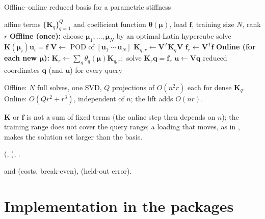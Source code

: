 \begin{algbox}{Offline--online reduced basis for a parametric stiffness}
\begin{pseudo}
\Require affine terms $\{\bm K_q\}_{q=1}^Q$ and coefficient function $\bm\theta(\bm\mu)$, load $\bm f$, training size $N$, rank $r$
\State \textbf{Offline (once):}
\State choose $\bm\mu_1,\dots,\bm\mu_N$ by an optimal Latin hypercube 
  \State solve $\bm K(\bm\mu_i)\bm u_i=\bm f$ 
\EndFor
\State $\bm V\gets$ POD of $[\bm u_1\ \cdots\ \bm u_N]$ 
  \State $\bm K_{q,r}\gets\bm V^T\bm K_q\bm V$
\EndFor
\State $\bm f_r\gets\bm V^T\bm f$
\State \textbf{Online (for each new $\bm\mu$):}
\State $\bm K_r\gets\sum_q\theta_q(\bm\mu)\bm K_{q,r}$;\ solve $\bm K_r\bm q=\bm f_r$
\State $\bm u\gets\bm V\bm q$ 
\Ensure reduced coordinates $\bm q$ (and $\bm u$) for every query
\end{pseudo}
\begin{algdet}
\item[Cost] Offline: $N$ full solves, one SVD, $Q$ projections of $O(n^2r)$ each for dense $\bm K_q$. Online: $O(Qr^2+r^3)$, independent of $n$; the lift adds $O(nr)$.
\item[Fails when] $\bm K$ or $\bm f$ is not a sum of fixed terms (the online step then depends on $n$); the training range does not cover the query range; a loading that moves, as in , makes the solution set larger than the basis.
\item[Code]  (, ), .
\item[Verified in]  and  (costs, break-even),  (held-out error).
\end{algdet}
\end{algbox}


\section{Implementation in the packages}\label{sec:pod-impl}

